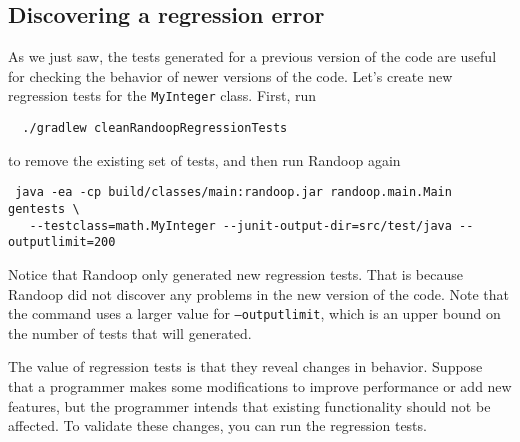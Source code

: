 \documentclass[11pt, oneside]{article} %
\newcommand{\code}[1]{{\texttt{#1}}}
\newcommand{\cmd}[1]{{\texttt{#1}}}
\begin{document}
\subsection{Discovering a regression error}

As we just saw, the tests generated for a previous version of the code are useful for checking the behavior of newer versions of the code.
Let's create new regression tests for the \code{MyInteger} class.
First, run
\begin{verbatim}
  ./gradlew cleanRandoopRegressionTests
\end{verbatim}
to remove the existing set of tests, and then run Randoop again
\begin{verbatim}
 java -ea -cp build/classes/main:randoop.jar randoop.main.Main gentests \
   --testclass=math.MyInteger --junit-output-dir=src/test/java --outputlimit=200
\end{verbatim}
Notice that Randoop only generated new regression tests.
That is because Randoop did not discover any problems in the new version of
the code.
Note that the command uses a larger value for \cmd{--outputlimit}, which is
an upper bound on the number of tests that will generated.

The value of regression tests is that they reveal changes in behavior.
Suppose that a programmer makes some modifications to improve performance
or add new features, but the programmer intends that existing functionality
should not be affected.
To validate these changes, you can run the regression tests.
\end{document}
